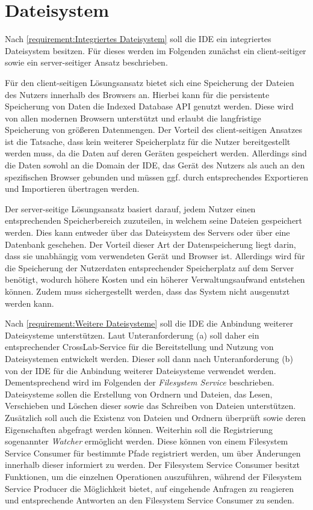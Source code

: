 \section{Dateisystem}\label{section:konzeption:dateisystem}

Nach \autoref{requirement:Integriertes Dateisystem} soll die IDE ein integriertes Dateisystem besitzen. Für dieses werden im Folgenden zunächst ein client-seitiger sowie ein server-seitiger Ansatz beschrieben.

Für den client-seitigen Lösungsansatz bietet sich eine Speicherung der Dateien des Nutzers innerhalb des Browsers an. Hierbei kann für die persistente Speicherung von Daten die Indexed Database API \cite{noauthor_indexed-database-api_nodate} genutzt werden. Diese wird von allen modernen Browsern unterstützt und erlaubt die langfristige Speicherung von größeren Datenmengen. Der Vorteil des client-seitigen Ansatzes ist die Tatsache, dass kein weiterer Speicherplatz für die Nutzer bereitgestellt werden muss, da die Daten auf deren Geräten gespeichert werden. Allerdings sind die Daten sowohl an die Domain der IDE, das Gerät des Nutzers als auch an den spezifischen Browser gebunden und müssen ggf. durch entsprechendes Exportieren und Importieren übertragen werden.

Der server-seitige Lösungsansatz basiert darauf, jedem Nutzer einen entsprechenden Speicherbereich zuzuteilen, in welchem seine Dateien gespeichert werden. Dies kann entweder über das Dateisystem des Servers oder über eine Datenbank geschehen. Der Vorteil dieser Art der Datenspeicherung liegt darin, dass sie unabhängig vom verwendeten Gerät und Browser ist. Allerdings wird für die Speicherung der Nutzerdaten entsprechender Speicherplatz auf dem Server benötigt, wodurch höhere Kosten und ein höherer Verwaltungsaufwand entstehen können. Zudem muss sichergestellt werden, dass das System nicht ausgenutzt werden kann.

Nach \autoref{requirement:Weitere Dateisysteme} soll die IDE die Anbindung weiterer Dateisysteme unterstützen. Laut Unteranforderung (a) soll daher ein entsprechender CrossLab-Service für die Bereitstellung und Nutzung von Dateisystemen entwickelt werden. Dieser soll dann nach Unteranforderung (b) von der IDE für die Anbindung weiterer Dateisysteme verwendet werden. Dementsprechend wird im Folgenden der \textit{Filesystem Service} beschrieben. Dateisysteme sollen die Erstellung von Ordnern und Dateien, das Lesen, Verschieben und Löschen dieser sowie das Schreiben von Dateien unterstützen. Zusätzlich soll auch die Existenz von Dateien und Ordnern überprüft sowie deren Eigenschaften abgefragt werden können. Weiterhin soll die Registrierung sogenannter \textit{Watcher} ermöglicht werden. Diese können von einem Filesystem Service Consumer für bestimmte Pfade registriert werden, um über Änderungen innerhalb dieser informiert zu werden. Der Filesystem Service Consumer besitzt Funktionen, um die einzelnen Operationen auszuführen, während der Filesystem Service Producer die Möglichkeit bietet, auf eingehende Anfragen zu reagieren und entsprechende Antworten an den Filesystem Service Consumer zu senden.

